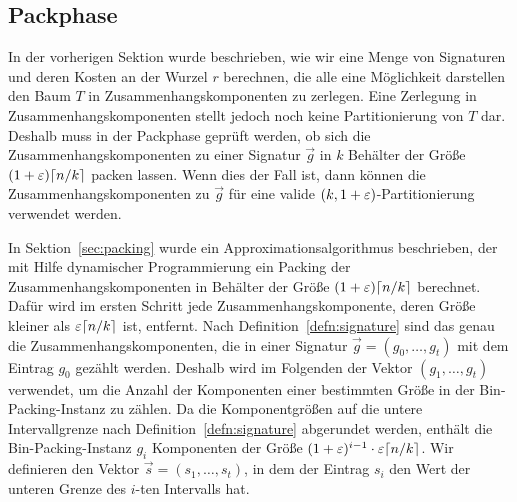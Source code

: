 \subsection{Packphase}\label{sec:packingimpl}
In der vorherigen Sektion wurde beschrieben, wie wir eine Menge von Signaturen und deren Kosten an der Wurzel $r$ berechnen, die alle eine Möglichkeit darstellen den Baum $T$ in Zusammenhangskomponenten zu zerlegen.
Eine Zerlegung in Zusammenhangskomponenten stellt jedoch noch keine Partitionierung von $T$ dar.
Deshalb muss in der Packphase geprüft werden, ob sich die Zusammenhangskomponenten zu einer Signatur $\vec{g}$ in $k$ Behälter der Größe $(1+\varepsilon)\lceil n/k\rceil$ packen lassen.
Wenn dies der Fall ist, dann können die Zusammenhangskomponenten zu $\vec{g}$ für eine valide $(k,1+\varepsilon)$\hyp Partitionierung verwendet werden.

In Sektion~\ref{sec:packing} wurde ein Approximationsalgorithmus beschrieben, der mit Hilfe dynamischer Programmierung ein Packing der Zusammenhangskomponenten in Behälter der Größe $(1+\varepsilon)\lceil n/k\rceil$ berechnet.
Dafür wird im ersten Schritt jede Zusammenhangskomponente, deren Größe kleiner als $\varepsilon \lceil n/k\rceil$ ist, entfernt.
Nach Definition~\ref{defn:signature} sind das genau die Zusammenhangskomponenten, die in einer Signatur $\vec{g} = (g_0, \ldots, g_t)$ mit dem Eintrag $g_0$ gezählt werden.
Deshalb wird im Folgenden der Vektor $(g_1, \ldots, g_t)$ verwendet, um die Anzahl der Komponenten einer bestimmten Größe in der Bin-Packing-Instanz zu zählen.
Da die Komponentgrößen auf die untere Intervallgrenze nach Definition~\ref{defn:signature} abgerundet werden, enthält die Bin-Packing-Instanz $g_i$ Komponenten der Größe $(1+\varepsilon)^{i-1} \cdot \varepsilon \lceil n/k\rceil$.
Wir definieren den Vektor $\vec{s} = (s_1, \ldots, s_t)$, in dem der Eintrag $s_i$ den Wert der unteren Grenze des $i$\hyp ten Intervalls hat.

